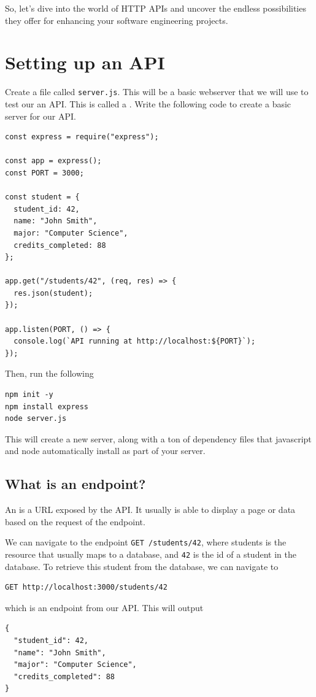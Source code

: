 So, let's dive into the world of HTTP APIs and uncover the endless
possibilities they offer for enhancing your software engineering
projects.

\section{Setting up an API}

Create a file called \texttt{server.js}. This will be a basic webserver that we will use to test our an API. This is called a . Write the following code to create a basic server for our API.
\begin{verbatim}
const express = require("express");

const app = express();
const PORT = 3000;

const student = {
  student_id: 42,
  name: "John Smith",
  major: "Computer Science",
  credits_completed: 88
};

app.get("/students/42", (req, res) => {
  res.json(student);
});

app.listen(PORT, () => {
  console.log(`API running at http://localhost:${PORT}`);
});
\end{verbatim}
Then, run the following
\begin{verbatim}
npm init -y   
npm install express
node server.js
\end{verbatim}
This will create a new server, along with a ton of dependency files that javascript and 
node automatically install as part of your server.
\subsection{What is an endpoint?}
An  is a URL exposed by the API. It usually is able to display a page or 
data based on the request of the endpoint.

We can navigate to the endpoint \texttt{GET /students/42}, where students is the resource 
that usually maps to a database, and \texttt{42} is the id of a student in the database. 
To retrieve this student from the database, we can navigate to
\begin{verbatim}
GET http://localhost:3000/students/42
\end{verbatim}
which is an endpoint from our API. This will output
\begin{verbatim}
{
  "student_id": 42,
  "name": "John Smith",
  "major": "Computer Science",
  "credits_completed": 88
}
\end{verbatim}


